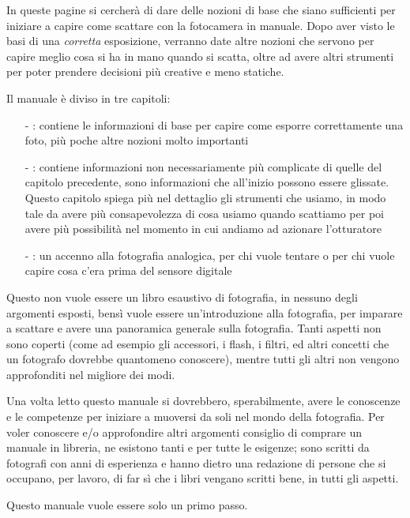 In queste pagine si cercherà di dare delle nozioni di base che siano sufficienti per iniziare a capire come scattare con la fotocamera in manuale.
Dopo aver visto le basi di una \textit{corretta} esposizione, verranno date altre nozioni che servono per capire meglio cosa si ha in mano quando si scatta, oltre ad avere altri strumenti per poter prendere decisioni più creative e meno statiche.

Il manuale è diviso in tre capitoli:
\begin{itemize}
    \item[-] \textbf{}: contiene le informazioni di base per capire come esporre correttamente una foto, più poche altre nozioni molto importanti
    \item[-] \textbf{}: contiene informazioni non necessariamente più complicate di quelle del capitolo precedente, sono informazioni che all'inizio possono essere glissate. Questo capitolo spiega più nel dettaglio gli strumenti che usiamo, in modo tale da avere più consapevolezza di cosa usiamo quando scattiamo per poi avere più possibilità nel momento in cui andiamo ad azionare l'otturatore
    \item[-] \textbf{}: un accenno alla fotografia analogica, per chi vuole tentare o per chi vuole capire cosa c'era prima del sensore digitale
\end{itemize}

Questo non vuole essere un libro esaustivo di fotografia, in nessuno degli argomenti esposti, bensì vuole essere un'introduzione alla fotografia, per imparare a scattare e avere una panoramica generale sulla fotografia.
Tanti aspetti non sono coperti (come ad esempio gli accessori, i flash, i filtri, ed altri concetti che un fotografo dovrebbe quantomeno conoscere), mentre tutti gli altri non vengono approfonditi nel migliore dei modi.

Una volta letto questo manuale si dovrebbero, sperabilmente, avere le conoscenze e le competenze per iniziare a muoversi da soli nel mondo della fotografia.
Per voler conoscere e/o approfondire altri argomenti consiglio di comprare un manuale in libreria, ne esistono tanti e per tutte le esigenze; sono scritti da fotografi con anni di esperienza e hanno dietro una redazione di persone che si occupano, per lavoro, di far sì che i libri vengano scritti bene, in tutti gli aspetti.

Questo manuale vuole essere solo un primo passo.